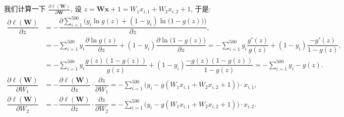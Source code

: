 \begin{frame}{\insertsection}{\insertsubsection}
我们计算一下 $\frac{\partial \ell(\bm{W})}{\partial \bm{W}}$, 设 $z = \bm{W}\bm{x} + 1 = W_1x_{i,1} + W_2x_{i,2} + 1$, 于是:
\begin{align*}
\dfrac{\partial \ell(\bm{W})}{\partial z} &= -\dfrac{\partial \displaystyle\sum_{i = 1}^{500} \Big(y_i\ln g(z) + (1 - y_i)\ln\big(1 - g(z)\big)\Big)}{\partial z}\text{,}\\
  &= -\sum_{i = 1}^{500} y_i \dfrac{\partial \ln g(z)}{\partial z} + (1 - y_i)\dfrac{\partial\ln \big(1 - g(z)\big)}{\partial z} = -\sum_{i = 1}^{500} y_i \dfrac{g'(z)}{g(z)} + (1 - y_i)\dfrac{-g'(z)}{1 - g(z)}\text{,}\\
  &= -\sum_{i = 1}^{500} y_i \dfrac{g(z)(1 - g(z))}{g(z)} + (1 - y_i)\dfrac{-g(z)(1 - g(z))}{1 - g(z)} = -\sum_{i = 1}^{500} y_i - g(z)\text{.}\\
  \dfrac{\partial \ell(\bm{W})}{\partial W_1} &= -\dfrac{\partial \ell(\bm{W})}{\partial z} \cdot \dfrac{\partial z}{\partial W_1} = -\sum_{i = 1}^{500} \big(y_i - g(W_1x_{i,1} + W_2x_{i,2} + 1)\big)\cdot x_{i,1}\text{,}\\
  \dfrac{\partial \ell(\bm{W})}{\partial W_2} &= -\dfrac{\partial \ell(\bm{W})}{\partial z} \cdot \dfrac{\partial z}{\partial W_2} = -\sum_{i = 1}^{500} \big(y_i - g(W_1x_{i,1} + W_2x_{i,2} + 1)\big)\cdot x_{i,2}\text{.}
\end{align*}
\end{frame}

